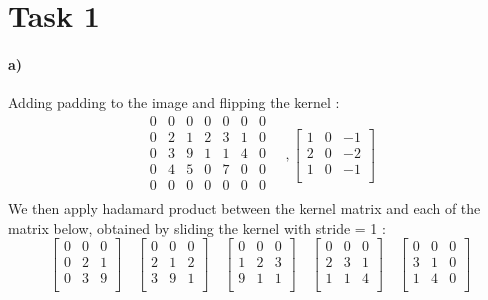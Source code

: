 \documentclass{article}
\begin{document}
	\section*{Task 1}
		\paragraph{a)}
		Adding padding to the image and flipping the kernel : 
		\[
		\begin{matrix}
			0 & 0 & 0 & 0 & 0 & 0 & 0 \\
			0 & 2 & 1 & 2 & 3 & 1 & 0\\
			0 & 3 & 9 & 1 & 1 & 4 & 0\\
			0 & 4 & 5 & 0 & 7 & 0 & 0\\
			0 & 0 & 0 & 0 & 0 & 0 & 0\\
		\end{matrix}
		\quad,
		\begin{bmatrix}
			1 & 0 & -1 \\
			2 & 0 & -2 \\
			1 & 0 & -1 \\
		\end{bmatrix}
		\]
		We then apply hadamard product between the kernel matrix and each of the matrix below, obtained by sliding the kernel with stride = 1 :
		\[
		\begin{bmatrix}
			0 & 0 & 0 \\
			0 & 2 & 1 \\
			0 & 3 & 9 \\
		\end{bmatrix}
		\quad
		\begin{bmatrix}
			0 & 0 & 0 \\
			2 & 1 & 2 \\
			3 & 9 & 1 \\
		\end{bmatrix}
		\quad
		\begin{bmatrix}
			0 & 0 & 0 \\
			1 & 2 & 3 \\
			9 & 1 & 1 \\
		\end{bmatrix}
		\quad
		\begin{bmatrix}
			0 & 0 & 0 \\
			2 & 3 & 1 \\
			1 & 1 & 4 \\
		\end{bmatrix}
		\quad
		\begin{bmatrix}
			0 & 0 & 0 \\
			3 & 1 & 0 \\
			1 & 4 & 0 \\
		\end{bmatrix}
		\]
\end{document}
